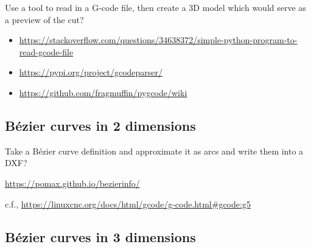 \documentclass{ltxdoc}
\begin{document}
Use a tool to read in a G-code file, then create a 3D model which would serve as a preview of the cut?

\begin{itemize}
\item \url{https://stackoverflow.com/questions/34638372/simple-python-program-to-read-gcode-file}
\item \url{https://pypi.org/project/gcodeparser/}
\item \url{https://github.com/fragmuffin/pygcode/wiki}
\end{itemize} 
 
\subsection*{Bézier curves in 2 dimensions}

Take a Bézier curve definition and approximate it as arcs and write them into a DXF?

\url{https://pomax.github.io/bezierinfo/}

c.f., \url{https://linuxcnc.org/docs/html/gcode/g-code.html#gcode:g5}

%
%
%
%
%
%
%
%

\subsection*{Bézier curves in 3 dimensions}
 
\end{document}
